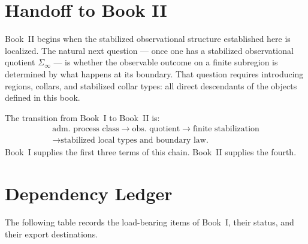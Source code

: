 \documentclass[12pt,oneside]{amsbook}
\theoremstyle{plain}
\theoremstyle{definition}
\theoremstyle{remark}
\begin{document}
\section{Handoff to Book II}

Book~II begins when the stabilized observational structure established
here is localized.  The natural next question — once one has a
stabilized observational quotient $\Sigma_\infty$ — is whether the
observable outcome on a finite subregion is determined by what happens
at its boundary.  That question requires introducing regions, collars,
and stabilized collar types: all direct descendants of the objects
defined in this book.

The transition from Book~I to Book~II is:
\begin{gather*}
\text{adm.~process class}
\to\text{obs.~quotient}
\to\text{finite stabilization}\\
\to\text{stabilized local types and boundary law.}
\end{gather*}
Book~I supplies the first three terms of this chain.
Book~II supplies the fourth.

\section{Dependency Ledger}

The following table records the load-bearing items of Book~I, their
status, and their export destinations.
\end{document}
